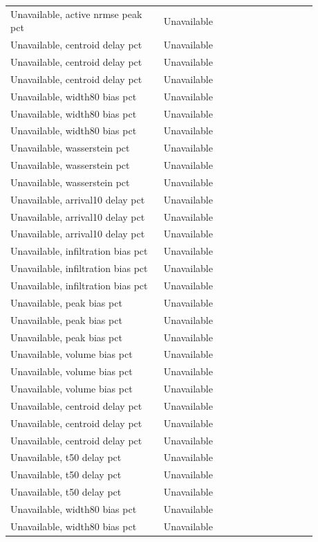 \begin{longtable}{p{0.4400\linewidth}p{0.4400\linewidth}}
Unavailable, active nrmse peak pct & Unavailable \\
Unavailable, centroid delay pct & Unavailable \\
Unavailable, centroid delay pct & Unavailable \\
Unavailable, centroid delay pct & Unavailable \\
Unavailable, width80 bias pct & Unavailable \\
Unavailable, width80 bias pct & Unavailable \\
Unavailable, width80 bias pct & Unavailable \\
Unavailable, wasserstein pct & Unavailable \\
Unavailable, wasserstein pct & Unavailable \\
Unavailable, wasserstein pct & Unavailable \\
Unavailable, arrival10 delay pct & Unavailable \\
Unavailable, arrival10 delay pct & Unavailable \\
Unavailable, arrival10 delay pct & Unavailable \\
Unavailable, infiltration bias pct & Unavailable \\
Unavailable, infiltration bias pct & Unavailable \\
Unavailable, infiltration bias pct & Unavailable \\
Unavailable, peak bias pct & Unavailable \\
Unavailable, peak bias pct & Unavailable \\
Unavailable, peak bias pct & Unavailable \\
Unavailable, volume bias pct & Unavailable \\
Unavailable, volume bias pct & Unavailable \\
Unavailable, volume bias pct & Unavailable \\
Unavailable, centroid delay pct & Unavailable \\
Unavailable, centroid delay pct & Unavailable \\
Unavailable, centroid delay pct & Unavailable \\
Unavailable, t50 delay pct & Unavailable \\
Unavailable, t50 delay pct & Unavailable \\
Unavailable, t50 delay pct & Unavailable \\
Unavailable, width80 bias pct & Unavailable \\
Unavailable, width80 bias pct & Unavailable \\

\end{longtable}
